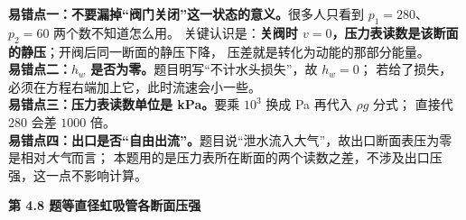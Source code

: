 \begin{yicuo}
\textbf{易错点一：不要漏掉“阀门关闭”这一状态的意义。}很多人只看到 $p_1=280$、$p_2=60$ 两个数不知道怎么用。
关键认识是：\textbf{关阀时 $v=0$，压力表读数是该断面的静压}；开阀后同一断面的静压下降，
压差就是转化为动能的那部分能量。\\
\textbf{易错点二：$h_w$ 是否为零。}题目明写“不计水头损失”，故 $h_w=0$；
若给了损失，必须在方程右端加上它，此时流速会小一些。\\
\textbf{易错点三：压力表读数单位是 kPa。}要乘 $10^3$ 换成 Pa 再代入 $\rho g$ 分式；
直接代 $280$ 会差 $1000$ 倍。\\
\textbf{易错点四：出口是否“自由出流”。}题目说“泄水流入大气”，故出口断面表压为零是相对\emph{大气}而言；
本题用的是压力表所在断面的两个读数之差，不涉及出口压强，这一点不影响计算。
\end{yicuo}

\noindent\textbf{第 4.8 题\quad 等直径虹吸管各断面压强}

